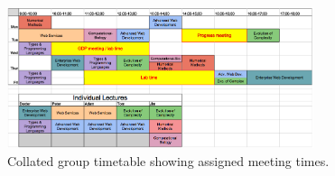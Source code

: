 \begin{appendices}
	\section{}
		\label{sec:appendix:A}
		
\begin{figure}[p]
\centering
\includegraphics[width=0.8\textwidth]{times.png}
\caption{Collated group timetable showing assigned meeting times.}
\label{fig:awesome_image}
\end{figure}

\end{appendices}

